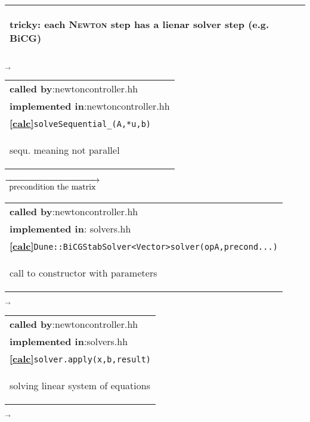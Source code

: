 \begin{landscape}
{\begin{tabular}{|l|}
    \begin{scriptsize}tricky: each \textsc{Newton} step has a lienar solver step (e.g. BiCG)\end{scriptsize}\\\hline 
  \end{tabular}
    $\overrightarrow{
    }$
     \begin{tabular}{|l|}
      \hline
      \textbf{called by}:newtoncontroller.hh\\
      \textbf{implemented in}:newtoncontroller.hh \\  
      \textbf{\textcircled{\ref{calc}}}\verb+solveSequential_(A,*u,b)+ \\
    \begin{scriptsize}sequ. meaning not parallel\end{scriptsize}\\\hline 
  \end{tabular}
\nextline
    {\scriptsize$\overrightarrow{
    \begin{array}{l}
     \textnormal{precondition the matrix}\\
    \end{array}
    }$}
     \begin{tabular}{|l|}
      \hline
      \textbf{called by}:newtoncontroller.hh\\
      \textbf{implemented in}: solvers.hh\\  
      \textbf{\textcircled{\ref{calc}}}\verb+Dune::BiCGStabSolver<Vector>solver(opA,precond...)+ \\
    \begin{scriptsize}call to constructor with parameters\end{scriptsize}\\\hline 
  \end{tabular}
    $\overrightarrow{
    }$
    \begin{tabular}{|l|}
      \hline
      \textbf{called by}:newtoncontroller.hh\\
      \textbf{implemented in}:solvers.hh \\  
      \textbf{\textcircled{\ref{calc}}}\verb+solver.apply(x,b,result)+ \\
    \begin{scriptsize}solving linear system of equations\end{scriptsize}\\\hline 
  \end{tabular}
    $\overrightarrow{
    }$
    \nextline
    \begin{tabular}{|l|}

\end{tabular}}
\end{landscape}
